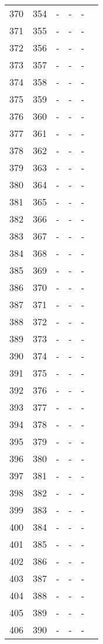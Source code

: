 \documentclass[10pt]{article}
\begin{document}
\begin{longtable}{llllll}
  370 & 354 & - & - & - &  \\ 
  371 & 355 & - & - & - &  \\ 
  372 & 356 & - & - & - &  \\ 
  373 & 357 & - & - & - &  \\ 
  374 & 358 & - & - & - &  \\ 
  375 & 359 & - & - & - &  \\ 
  376 & 360 & - & - & - &  \\ 
  377 & 361 & - & - & - &  \\ 
  378 & 362 & - & - & - &  \\ 
  379 & 363 & - & - & - &  \\ 
  380 & 364 & - & - & - &  \\ 
  381 & 365 & - & - & - &  \\ 
  382 & 366 & - & - & - &  \\ 
  383 & 367 & - & - & - &  \\ 
  384 & 368 & - & - & - &  \\ 
  385 & 369 & - & - & - &  \\ 
  386 & 370 & - & - & - &  \\ 
  387 & 371 & - & - & - &  \\ 
  388 & 372 & - & - & - &  \\ 
  389 & 373 & - & - & - &  \\ 
  390 & 374 & - & - & - &  \\ 
  391 & 375 & - & - & - &  \\ 
  392 & 376 & - & - & - &  \\ 
  393 & 377 & - & - & - &  \\ 
  394 & 378 & - & - & - &  \\ 
  395 & 379 & - & - & - &  \\ 
  396 & 380 & - & - & - &  \\ 
  397 & 381 & - & - & - &  \\ 
  398 & 382 & - & - & - &  \\ 
  399 & 383 & - & - & - &  \\ 
  400 & 384 & - & - & - &  \\ 
  401 & 385 & - & - & - &  \\ 
  402 & 386 & - & - & - &  \\ 
  403 & 387 & - & - & - &  \\ 
  404 & 388 & - & - & - &  \\ 
  405 & 389 & - & - & - &  \\ 
  406 & 390 & - & - & - &  \\ 

\end{longtable}
\end{document}
